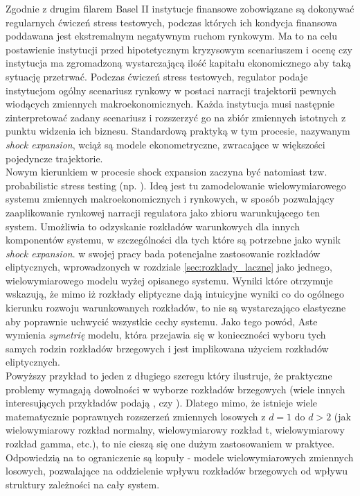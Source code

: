 Zgodnie z drugim filarem Basel II instytucje finansowe zobowiązane są dokonywać regularnych ćwiczeń stress testowych, podczas których ich kondycja finansowa poddawana jest ekstremalnym negatywnym ruchom rynkowym. Ma to na celu postawienie instytucji przed hipotetycznym kryzysowym scenariuszem i ocenę czy instytucja ma zgromadzoną wystarczającą ilość kapitału ekonomicznego aby taką sytuację przetrwać. Podczas ćwiczeń stress testowych, regulator podaje instytucjom ogólny scenariusz rynkowy w postaci narracji trajektorii pewnych wiodących zmiennych makroekonomicznych. Każda instytucja musi następnie zinterpretować zadany scenariusz i rozszerzyć go na zbiór zmiennych istotnych z punktu widzenia ich biznesu. Standardową praktyką w tym procesie, nazywanym \emph{shock expansion}, wciąż są modele ekonometryczne, zwracające w większości pojedyncze trajektorie. \cite{Siddique_Stress_testing}\\
Nowym kierunkiem w procesie shock expansion zaczyna być natomiast tzw. probabilistic stress testing (np. \cite{Aste_Probabilistic_Stress_Testing}). Ideą jest tu zamodelowanie wielowymiarowego systemu zmiennych makroekonomicznych i rynkowych, w sposób pozwalający zaaplikowanie rynkowej narracji regulatora jako zbioru warunkującego ten system. Umożliwia to odzyskanie rozkładów warunkowych dla innych komponentów systemu, w szczególności dla tych które są potrzebne jako wynik \emph{shock expansion}. \cite{Aste_Probabilistic_Stress_Testing} w swojej pracy bada potencjalne zastosowanie rozkładów eliptycznych, wprowadzonych w rozdziale \ref{sec:rozklady_laczne} jako jednego, wielowymiarowego modelu wyżej opisanego systemu. Wyniki które otrzymuje wskazują, że mimo iż rozkłady eliptyczne dają intuicyjne wyniki co do ogólnego kierunku rozwoju warunkowanych rozkładów, to nie są wystarczająco elastyczne aby poprawnie uchwycić wszystkie cechy systemu. Jako tego powód, Aste wymienia \textit{symetrię} modelu, która przejawia się w konieczności wyboru tych samych rodzin rozkładów brzegowych i jest implikowana użyciem rozkładów eliptycznych.\\

Powyższy przykład to jeden z długiego szeregu który ilustruje, że praktyczne problemy wymagają dowolności w wyborze rozkładów brzegowych (wiele innych interesujących przykładów podają \cite{Cherubini_Copula_Methods_in_Finance}, czy \cite{Cherubini_Dynamic_Copula_Methods_in_Finance}). Dlatego mimo, że istnieje wiele matematycznie poprawnych rozszerzeń zmiennych losowych z $d=1$ do $d>2$ (jak wielowymiarowy rozkład normalny, wielowymiarowy rozkład t, wielowymiarowy rozkład gamma, etc.), to nie cieszą się one dużym zastosowaniem w praktyce. Odpowiedzią na to ograniczenie są kopuły - modele wielowymiarowych zmiennych losowych, pozwalające na oddzielenie wpływu rozkładów brzegowych od wpływu struktury zależności na cały system.\\